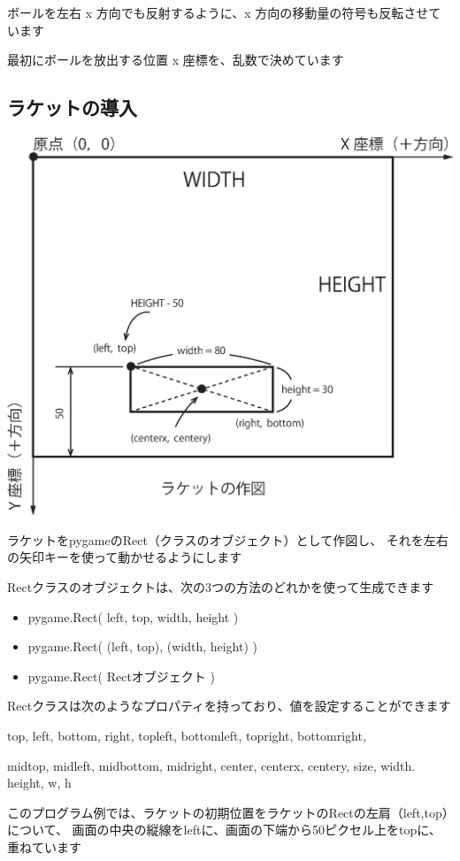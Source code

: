 \documentclass[uplatex,a4paper,11pt,oneside,openany]{jsbook}
\begin{document}
ボールを左右 x 方向でも反射するように、x 方向の移動量の符号も反転させています

最初にボールを放出する位置 x 座標を、乱数で決めています



\subsection{ラケットの導入}

\begin{center}
\includegraphics[width=0.5\hsize]{figures/eps/pg11.eps}
\end{center}

ラケットをpygameのRect（クラスのオブジェクト）として作図し、
それを左右の矢印キーを使って動かせるようにします

Rectクラスのオブジェクトは、次の3つの方法のどれかを使って生成できます

\begin{itemize}
\item pygame.Rect( left, top, width, height )
\item pygame.Rect( (left, top), (width, height) )
\item pygame.Rect( Rectオブジェクト )
\end{itemize}

Rectクラスは次のようなプロパティを持っており、値を設定することができます

top, left, bottom, right,
topleft, bottomleft, topright, bottomright,

midtop, midleft, midbottom, midright,
center, centerx, centery, size, width. height, w, h

このプログラム例では、ラケットの初期位置をラケットのRectの左肩（left,top）について、
画面の中央の縦線をleftに、画面の下端から50ピクセル上をtopに、重ねています
\end{document}
